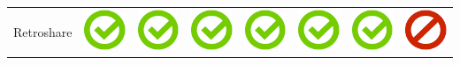 \documentclass[10pt,foldmark,tumble]{leaflet}
\begin{document}
{\begin{tabular}{ L{2cm} | C{2cm} | C{2cm} | C{2cm} | C{2cm} | C{2cm} | C{2cm} | C{2cm} | }
Retroshare & \includegraphics[scale=0.1]{pics/haken.png} & \includegraphics[scale=0.1]{pics/haken.png} & \includegraphics[scale=0.1]{pics/haken.png} & \includegraphics[scale=0.1]{pics/haken.png} & \includegraphics[scale=0.1]{pics/haken.png} & \includegraphics[scale=0.1]{pics/haken.png} & \includegraphics[scale=0.1]{pics/nohaken.png} \tabularnewline

\end{tabular}}
\end{document}
